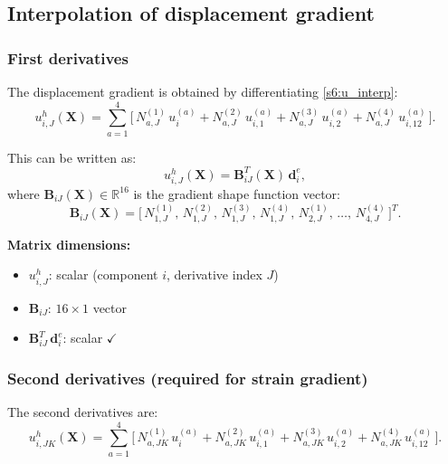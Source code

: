 \documentclass[11pt]{article}
\newcommand{\bX}{\mathbf{X}}
\newcommand{\bX}{\mathbf{X}}
\begin{document}
\subsection{Interpolation of displacement gradient}
\label{ssec:grad_interp}

\subsubsection{First derivatives}

The displacement gradient is obtained by differentiating
\eqref{s6:u_interp}:
\begin{equation}
u_{i,J}^{h}(\bX)
= \sum_{a=1}^{4}\bigl[\,
   N_{a,J}^{(1)}\,u_{i}^{(a)}
 + N_{a,J}^{(2)}\,u_{i,1}^{(a)}
 + N_{a,J}^{(3)}\,u_{i,2}^{(a)}
 + N_{a,J}^{(4)}\,u_{i,12}^{(a)}
\,\bigr].
\label{s6:u_grad_interp}
\end{equation}

This can be written as:
\begin{equation}
\boxed{
u_{i,J}^{h}(\bX) = \mathbf{B}_{iJ}^{T}(\bX)\,\mathbf{d}_{i}^{e},
}
\label{s6:u_grad_matrix}
\end{equation}
where $\mathbf{B}_{iJ}(\bX)\in\mathbb{R}^{16}$ is the gradient shape
function vector:
\begin{equation}
\mathbf{B}_{iJ}(\bX)
= \bigl[\,
   N_{1,J}^{(1)},\,N_{1,J}^{(2)},\,N_{1,J}^{(3)},\,N_{1,J}^{(4)},
   \,N_{2,J}^{(1)},\,\ldots,\,N_{4,J}^{(4)}
\,\bigr]^{T}.
\end{equation}

\textbf{Matrix dimensions:}
\begin{itemize}
\item $u_{i,J}^{h}$: scalar (component $i$, derivative index $J$)
\item $\mathbf{B}_{iJ}$: $16\times 1$ vector
\item $\mathbf{B}_{iJ}^{T}\,\mathbf{d}_{i}^{e}$: scalar $\checkmark$
\end{itemize}

\subsubsection{Second derivatives (required for strain gradient)}

The second derivatives are:
\begin{equation}
u_{i,JK}^{h}(\bX)
= \sum_{a=1}^{4}\bigl[\,
   N_{a,JK}^{(1)}\,u_{i}^{(a)}
 + N_{a,JK}^{(2)}\,u_{i,1}^{(a)}
 + N_{a,JK}^{(3)}\,u_{i,2}^{(a)}
 + N_{a,JK}^{(4)}\,u_{i,12}^{(a)}
\,\bigr].
\label{s6:u_2nd_interp}
\end{equation}
\end{document}
